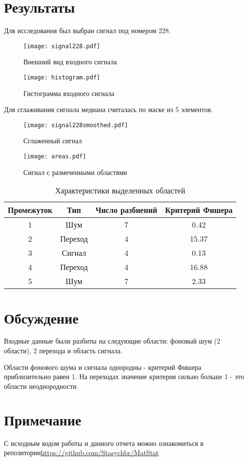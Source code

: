 \documentclass[a4paper,12pt]{article} %
\begin{document}
\section{Результаты}
Для исследования был выбран сигнал под номером 228. 
\begin{figure}[H]
    \centering
    \texttt{[image: signal228.pdf]}
    \caption{Внешний вид входного сигнала}
    \label{fig:imag}
\end{figure}
\begin{figure}[H]
    \centering
    \texttt{[image: histogram.pdf]}
    \caption{Гистограмма входного сигнала}
    \label{fig:hist}
\end{figure}
Для сглаживания сигнала медиана считалась по маске из 5 элементов.
\begin{figure}[H]
    \centering
    \texttt{[image: signal228smoothed.pdf]}
    \caption{Сглаженный сигнал}
    \label{fig:smooth}
\end{figure}
\begin{figure}[H]
    \centering
    \texttt{[image: areas.pdf]}
    \caption{Сигнал с размеченными областями}
    \label{fig:areas}
\end{figure}
\begin{table}[H]
    \centering
    \begin{tabular}{|c|c|c|c|}
        \hline
         Промежуток&Тип&Число разбиений& Критерий Фишера \\
         \hline
         1&Шум&7&0.42\\
         \hline
         2&Переход&4&15.37\\
         \hline
         3&Сигнал&4&0.13\\
         \hline
         4&Переход&4&16.88\\
         \hline
         5&Шум&7&2.33\\
         \hline
    \end{tabular}
    \caption{Характеристики выделенных областей}
    \label{tab:tab1}
\end{table}
\section{Обсуждение}
Входные данные были разбиты на следующие области: фоновый шум (2 области), 2 перехода и область сигнала.

Области фонового шума и сигнала однородны - критерий Фишера приблизительно равен 1. На переходах значение критерия сильно больше 1 - это области неоднородности.
\section*{Примечание}
С исходным кодом работы и данного отчета можно ознакомиться в репозитории\;\url{https://github.com/Stasychbr/MatStat}
\end{document}
